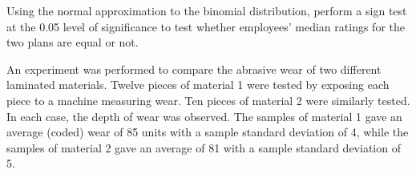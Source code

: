 \documentclass[letterpaper,10pt,addpoints]{exam}
\begin{document}
\begin{questions}
\begin{parts}
Using the normal approximation to the binomial distribution, perform a sign test at the 0.05 level of significance to test whether employees' median ratings for the two plans are equal or not. 




\end{parts}

\question[20]
An experiment was performed to compare the abrasive wear of two different laminated materials. Twelve pieces of material 1 were tested by exposing each piece to a machine measuring wear. Ten pieces of material 2 were similarly tested. In each case, the depth of wear was observed. The samples of material 1 gave an average (coded) wear of 85 units with a sample standard deviation of 4, while the samples of material 2 gave an average of 81 with a sample standard deviation of 5. 



\end{questions}
\end{document}
